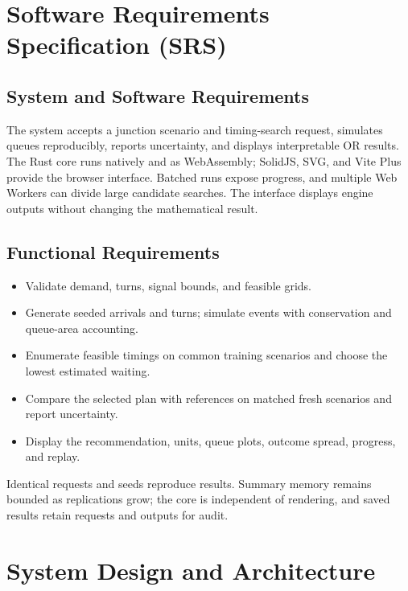 \documentclass[12pt,a4paper]{report}
\begin{document}
\chapter{Software Requirements Specification (SRS)}
\section{System and Software Requirements}
The system accepts a junction scenario and timing-search request, simulates queues reproducibly, reports uncertainty, and displays interpretable OR results. The Rust core runs natively and as WebAssembly; SolidJS, SVG, and Vite Plus provide the browser interface. Batched runs expose progress, and multiple Web Workers can divide large candidate searches. The interface displays engine outputs without changing the mathematical result.

\section{Functional Requirements}
\begin{itemize}
\item Validate demand, turns, signal bounds, and feasible grids.
\item Generate seeded arrivals and turns; simulate events with conservation and queue-area accounting.
\item Enumerate feasible timings on common training scenarios and choose the lowest estimated waiting.
\item Compare the selected plan with references on matched fresh scenarios and report uncertainty.
\item Display the recommendation, units, queue plots, outcome spread, progress, and replay.
\end{itemize}
Identical requests and seeds reproduce results. Summary memory remains bounded as replications grow; the core is independent of rendering, and saved results retain requests and outputs for audit.

\chapter{System Design and Architecture}
\end{document}
